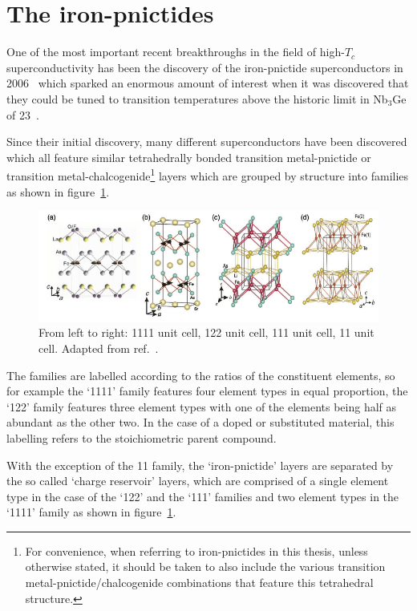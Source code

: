 
\section{The iron-pnictides}

One of the most important recent breakthroughs in the field of high-$T_c$ superconductivity has been the discovery of the iron-pnictide superconductors in 2006~\cite{Kamihara2006, Kamihara2008} which sparked an enormous amount of interest when it was discovered that they could be tuned to transition temperatures above the historic limit in Nb$_3$Ge of \unit{23}{\kelvin}~\cite{Attfield2010}.

Since their initial discovery, many different superconductors have been discovered which all feature similar tetrahedrally bonded transition metal-pnictide or transition metal-chalcogenide\footnote{For convenience, when referring to iron-pnictides in this thesis, unless otherwise stated, it should be taken to also include the various transition metal-pnictide/chalcogenide combinations that feature this tetrahedral structure.} layers which are grouped by structure into families as shown in figure~\ref{Fig:Intro:PnictideUnitCells}.
\begin{figure}[htbp]
    \begin{center}
        \includegraphics[scale=1.1]{Chapter-Introduction/Figures/PnictideUnitCells/PnictideUnitCells}
        \caption{From left to right: 1111 unit cell, 122 unit cell, 111 unit cell, 11 unit cell. Adapted from ref.~\cite{Johnston2010}.}
        \label{Fig:Intro:PnictideUnitCells}
    \end{center}
\end{figure}
The families are labelled according to the ratios of the constituent elements, so for example the `1111' family features four element types in equal proportion, the `122' family features three element types with one of the elements being half as abundant as the other two. In the case of a doped or substituted material, this labelling refers to the stoichiometric parent compound. 

With the exception of the 11 family, the `iron-pnictide' layers are separated by the so called `charge reservoir' layers, which are comprised of a single element type in the case of the `122' and the `111' families and two element types in the `1111' family as shown in figure~\ref{Fig:Intro:PnictideUnitCells}.

